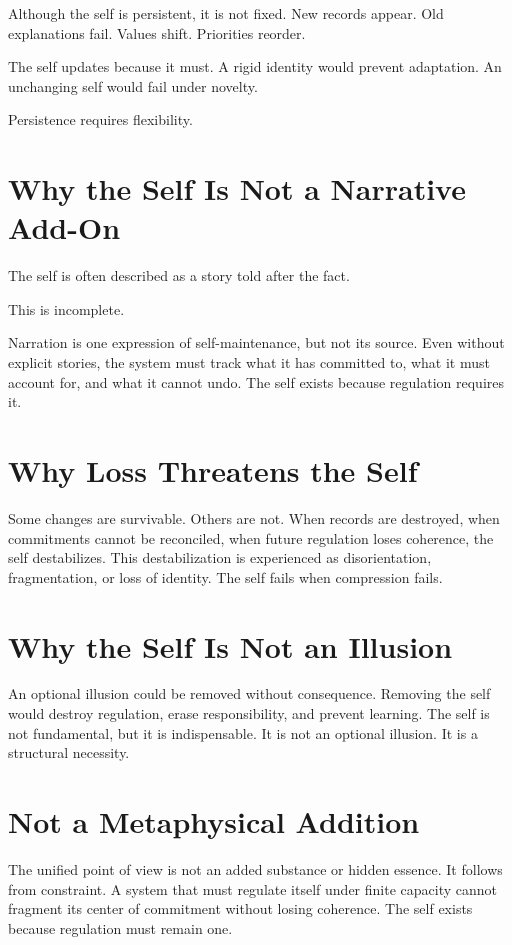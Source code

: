 \documentclass[11pt,twoside,openright]{book}
\begin{document}
Although the self is persistent, it is not fixed. New records appear. Old explanations fail. Values shift. Priorities reorder.

The self updates because it must. A rigid identity would prevent adaptation. An unchanging self would fail under novelty.

Persistence requires flexibility.

\section*{Why the Self Is Not a Narrative Add-On}

The self is often described as a story told after the fact.

This is incomplete.

Narration is one expression of self-maintenance, but not its source. Even without explicit stories, the system must track what it has committed to, what it must account for, and what it cannot undo. The self exists because regulation requires it.

\section*{Why Loss Threatens the Self}

Some changes are survivable. Others are not. When records are destroyed, when commitments cannot be reconciled, when future regulation loses coherence, the self destabilizes. This destabilization is experienced as disorientation, fragmentation, or loss of identity. The self fails when compression fails.

\section*{Why the Self Is Not an Illusion}

An optional illusion could be removed without consequence. Removing the self would destroy regulation, erase responsibility, and prevent learning. The self is not fundamental, but it is indispensable. It is not an optional illusion. It is a structural necessity.

\section*{Not a Metaphysical Addition}

The unified point of view is not an added substance or hidden essence. It follows from constraint. A system that must regulate itself under finite capacity cannot fragment its center of commitment without losing coherence. The self exists because regulation must remain one.
\end{document}
